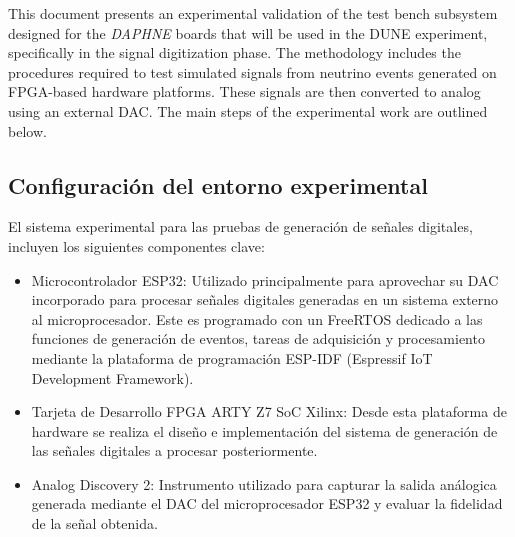 

This document presents an experimental validation of the test bench subsystem designed for the \textit{DAPHNE} boards that will be used in the DUNE experiment, specifically in the signal digitization phase. The methodology includes the procedures required to test simulated signals from neutrino events generated on FPGA-based hardware platforms. These signals are then converted to analog using an external DAC. The main steps of the experimental work are outlined below. %


    \subsection{Configuración del entorno experimental}
    
    El sistema experimental para las pruebas de generación de señales digitales, incluyen los siguientes componentes clave:
    \begin{itemize}
        \item Microcontrolador ESP32: Utilizado principalmente para aprovechar su DAC incorporado para procesar señales digitales generadas en un sistema externo al microprocesador. Este es programado con un FreeRTOS dedicado a las funciones de generación de eventos, tareas de adquisición y procesamiento mediante la plataforma de programación ESP-IDF (Espressif IoT Development Framework).
        
        \item Tarjeta de Desarrollo FPGA ARTY Z7 SoC Xilinx: Desde esta plataforma de hardware se realiza el diseño e implementación del sistema de generación de las señales digitales a procesar posteriormente.
        \item Analog Discovery 2: Instrumento utilizado para capturar la salida análogica generada mediante el DAC del microprocesador ESP32 y evaluar la fidelidad de la señal obtenida.
    \end{itemize}
    
